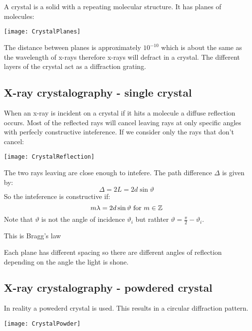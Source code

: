 \section{}

A crystal is a solid with a repeating molecular structure. It has planes of molecules:

\begin{center}
\texttt{[image: CrystalPlanes]}
\end{center}

The distance between planes is approximately \(10^{-10}\) which is about the same as the wavelength of x-rays therefore x-rays will defract in a crystal. The different layers of the crystal act as a diffraction grating.

\subsection*{X-ray crystalography - single crystal}

When an x-ray is incident on a crystal if it hits a molecule a diffuse reflection occurs. Most of the reflected rays will cancel leaving rays at only specific angles with perfecly constructive inteference. If we consider only the rays that don't cancel:

\begin{center}
\texttt{[image: CrystalReflection]}
\end{center}

The two rays leaving are close enough to intefere. The path difference \(\Delta\) is given by:
\[\Delta = 2L=2d\sin\vartheta\]
So the inteference is constructive if:
\[m\lambda=2d\sin\vartheta\text{ for }m\in\mathbb{Z}\]
Note that \(\vartheta\) is not the angle of incidence \(\vartheta_i\) but rathter \(\vartheta = \frac{\pi}{2}-\vartheta_i\).

This is Bragg's law

Each plane has different spacing so there are different angles of reflection depending on the angle the light is shone.

\subsection*{X-ray crystalography - powdered crystal}

In reality a powederd crystal is used. This results in a circular diffraction pattern.

\begin{center}
\texttt{[image: CrystalPowder]}
\end{center}

